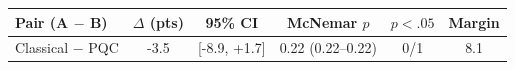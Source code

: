 \begin{tabular}{lccccc}
\toprule
Pair (A $-$ B) & $\Delta$ (pts) & 95\% CI & McNemar $p$ & $p<.05$ & Margin \\
\midrule
Classical $-$ PQC & -3.5 & [-8.9, +1.7] & 0.22 (0.22--0.22) & 0/1 & 8.1 \\
\bottomrule
\end{tabular}